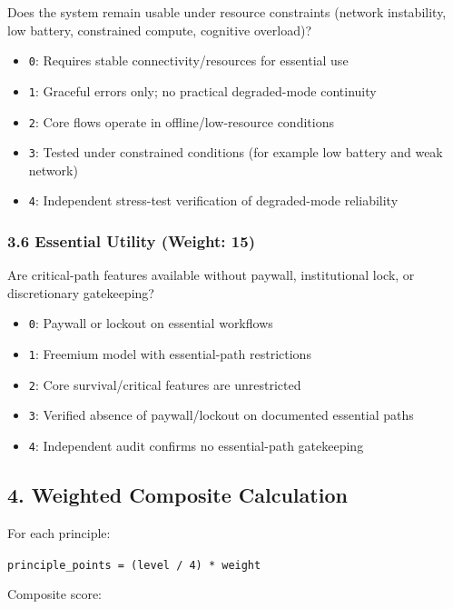 \documentclass[
]{article}
\providecommand{\tightlist}{%
  \setlength{\itemsep}{0pt}\setlength{\parskip}{0pt}}
\begin{document}
Does the system remain usable under resource constraints (network
instability, low battery, constrained compute, cognitive overload)?

\begin{itemize}
\tightlist
\item
  \texttt{0}: Requires stable connectivity/resources for essential use
\item
  \texttt{1}: Graceful errors only; no practical degraded-mode
  continuity
\item
  \texttt{2}: Core flows operate in offline/low-resource conditions
\item
  \texttt{3}: Tested under constrained conditions (for example low
  battery and weak network)
\item
  \texttt{4}: Independent stress-test verification of degraded-mode
  reliability
\end{itemize}

\subsubsection{3.6 Essential Utility (Weight:
15)}\label{36-essential-utility-weight-15}

Are critical-path features available without paywall, institutional
lock, or discretionary gatekeeping?

\begin{itemize}
\tightlist
\item
  \texttt{0}: Paywall or lockout on essential workflows
\item
  \texttt{1}: Freemium model with essential-path restrictions
\item
  \texttt{2}: Core survival/critical features are unrestricted
\item
  \texttt{3}: Verified absence of paywall/lockout on documented
  essential paths
\item
  \texttt{4}: Independent audit confirms no essential-path gatekeeping
\end{itemize}

\subsection{4. Weighted Composite
Calculation}\label{4-weighted-composite-calculation}

For each principle:

\texttt{principle\_points\ =\ (level\ /\ 4)\ *\ weight}

Composite score:
\end{document}

